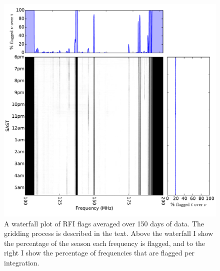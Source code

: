 \begin{figure}[h!]
\centering
\includegraphics[width=\textwidth]{chapters/data_processing/figures/RFI_all_128.pdf}
\caption[A waterfall plot of RFI flags averaged over 150 days of PAPER-128 data.]{A waterfall plot of RFI flags averaged over 150 days of data. The gridding process is described in the text. Above the waterfall I show the percentage of the season each frequency is flagged, and to the right I show the percentage of frequencies that are flagged per integration.}
\label{fig:rfi_psa128_waterfall}
\end{figure}

